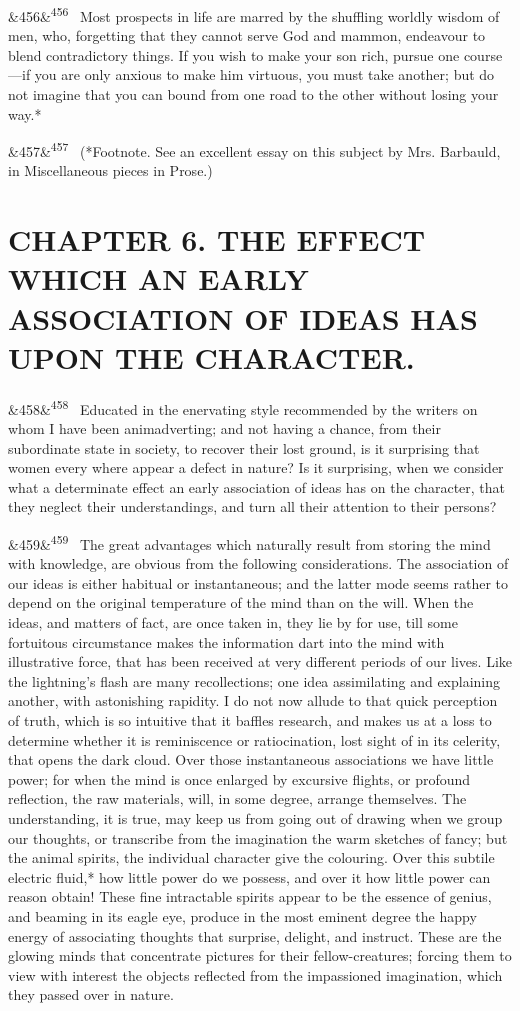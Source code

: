 \documentclass[12pt]{article}
\newcommand{\para}[1][]{\par\noindent\ifx&#1&\else\textsuperscript{\footnotesize #1}~\fi}
\begin{document}
\para[456] Most prospects in life are marred by the shuffling worldly wisdom of men, who, forgetting that they cannot serve God and mammon, endeavour to blend contradictory things. If you wish to make your son rich, pursue one course ---if you are only anxious to make him virtuous, you must take another; but do not imagine that you can bound from one road to the other without losing your way.*

\para[457] (*Footnote. See an excellent essay on this subject by Mrs. Barbauld, in Miscellaneous pieces in Prose.)

\section*{CHAPTER 6. THE EFFECT WHICH AN EARLY ASSOCIATION OF IDEAS HAS UPON THE CHARACTER.}

\para[458] Educated in the enervating style recommended by the writers on whom I have been animadverting; and not having a chance, from their subordinate state in society, to recover their lost ground, is it surprising that women every where appear a defect in nature? Is it surprising, when we consider what a determinate effect an early association of ideas has on the character, that they neglect their understandings, and turn all their attention to their persons?

\para[459] The great advantages which naturally result from storing the mind with knowledge, are obvious from the following considerations. The association of our ideas is either habitual or instantaneous; and the latter mode seems rather to depend on the original temperature of the mind than on the will. When the ideas, and matters of fact, are once taken in, they lie by for use, till some fortuitous circumstance makes the information dart into the mind with illustrative force, that has been received at very different periods of our lives. Like the lightning's flash are many recollections; one idea assimilating and explaining another, with astonishing rapidity. I do not now allude to that quick perception of truth, which is so intuitive that it baffles research, and makes us at a loss to determine whether it is reminiscence or ratiocination, lost sight of in its celerity, that opens the dark cloud. Over those instantaneous associations we have little power; for when the mind is once enlarged by excursive flights, or profound reflection, the raw materials, will, in some degree, arrange themselves. The understanding, it is true, may keep us from going out of drawing when we group our thoughts, or transcribe from the imagination the warm sketches of fancy; but the animal spirits, the individual character give the colouring. Over this subtile electric fluid,* how little power do we possess, and over it how little power can reason obtain! These fine intractable spirits appear to be the essence of genius, and beaming in its eagle eye, produce in the most eminent degree the happy energy of associating thoughts that surprise, delight, and instruct. These are the glowing minds that concentrate pictures for their fellow-creatures; forcing them to view with interest the objects reflected from the impassioned imagination, which they passed over in nature.
\end{document}
